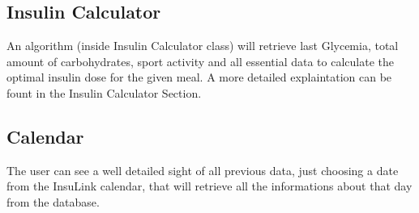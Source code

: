 \documentclass[12pt,hidelinks]{article}
\begin{document}
	\subsection{Insulin Calculator}
    An algorithm (inside Insulin Calculator class) will retrieve last Glycemia, total amount of carbohydrates, sport activity and all essential data
	to calculate the optimal insulin dose for the given meal. A more detailed explaintation can be fount in the Insulin Calculator Section.

	\subsection{Calendar}
	The user can see a well detailed sight of all previous data, just choosing a date from the InsuLink calendar, that will retrieve all the informations
	about that day from the database.
\end{document}
